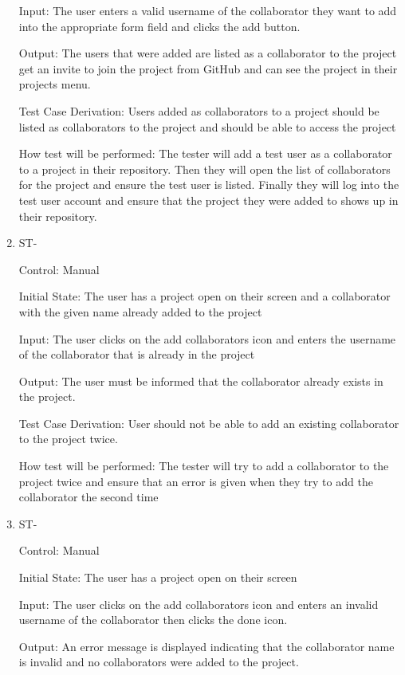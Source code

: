 \documentclass[12pt, titlepage]{article}
\newcounter{TESTID}
\newcommand\TESTNUM{\stepcounter{TESTID}\theTESTID}
\begin{document}
\begin{enumerate}
		Input: The user enters a valid username of the collaborator they want to add into the appropriate form field and clicks the add button.
		
		Output: The users that were added are listed as a collaborator to the project get an invite to join the project from GitHub and can see the project in their projects menu.
		
		Test Case Derivation: Users added as collaborators to a project should be listed as collaborators to the project and should be able to access the project
		
		How test will be performed: The tester will add a test user as a collaborator to a project in their repository. Then they will open the list of collaborators for the project and ensure the test user is listed. Finally they will log into the test user account and ensure that the project they were added to shows up in their repository.
		
		\item{ST-\TESTNUM\\}
		
		Control: Manual
		
		Initial State: The user has a project open on their screen and a collaborator with the given name already added to the project
		
		Input: The user clicks on the add collaborators icon and enters the username of the collaborator that is already in the project
		
		Output: The user must be informed that the collaborator already exists in the project.
		
		Test Case Derivation: User should not be able to add an existing collaborator to the project twice.
		
		How test will be performed: The tester will try to add a collaborator to the project twice and ensure that an error is given when they try to add the collaborator the second time
		
		\item{ST-\TESTNUM\\}
		
		Control: Manual
		
		Initial State: The user has a project open on their screen
		
		Input: The user clicks on the add collaborators icon and enters an invalid username of the collaborator then clicks the done icon.
		
		Output: An error message is displayed indicating that the collaborator name is invalid and no collaborators were added to the project.
		

\end{enumerate}
\end{document}
